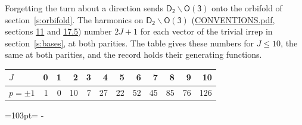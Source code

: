 \documentclass[10pt,a4paper]{article}
\newcommand{\needspace}[1]{\par\penalty-100\begingroup\dimen0=#1\relax\dimen2=\pagegoal
  \advance\dimen2-\pagetotal\ifdim\dimen0>\dimen2\relax\ifdim\dimen2>0pt\vfil\break\fi\fi
  \endgroup}
\numberwithin{equation}{section}
\newcommand{\grp}[1]{\mathsf{#1}}
\begin{document}
Forgetting the turn about a direction sends $\grp{D_{2}}\backslash\grp{O(3)}$ onto the orbifold of section~\ref{s:orbifold}.
The harmonics on $\grp{D_{2}}\backslash\grp{O(3)}$ (\href{../../CONVENTIONS.pdf}{CONVENTIONS.pdf}, sections \href{../../CONVENTIONS.pdf\#conv.11}{11} and \href{../../CONVENTIONS.pdf\#conv.17.5}{17.5}) number $2J + 1$ for each vector of the trivial irrep in section~\ref{s:bases}, at both parities. The table gives these numbers for $J \le 10$, the same at both parities, and the record holds their generating functions.
{\small\setlength{\tabcolsep}{4pt}\begin{longtable}{@{}lrrrrrrrrrrr@{}}\toprule
$J$ & 0 & 1 & 2 & 3 & 4 & 5 & 6 & 7 & 8 & 9 & 10\\\midrule\endhead
\bottomrule\endfoot\endlastfoot
$p = \pm 1$ & 1 & 0 & 10 & 7 & 27 & 22 & 52 & 45 & 85 & 76 & 126\\
\bottomrule\end{longtable}}
\needspace{103pt}
\end{document}
